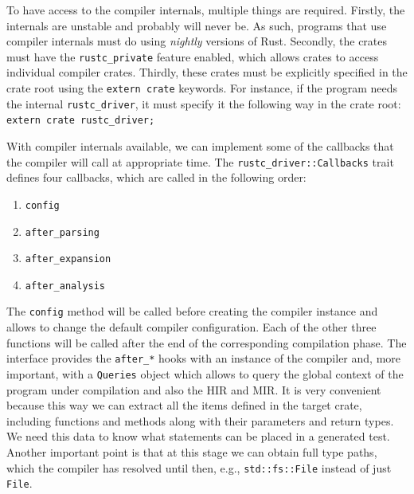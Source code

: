 \documentclass{article}
\begin{document}
To have access to the compiler internals, multiple things are required. Firstly, the internals are unstable and probably will never be. As such, programs that use compiler internals must do using \textit{nightly} versions of Rust. Secondly, the crates must have the \lstinline{rustc_private} feature enabled, which allows crates to access individual compiler crates. Thirdly, these crates must be explicitly specified in the crate root using the \lstinline{extern crate} keywords. For instance, if the program needs the internal \lstinline{rustc_driver}, it must specify it the following way in the crate root: \lstinline{extern crate rustc_driver;}

With compiler internals available, we can implement some of the callbacks that the compiler will call at appropriate time. The \lstinline{rustc_driver::Callbacks} trait defines four callbacks, which are called in the following order:
\begin{enumerate}
    \item \lstinline{config}
    \item \lstinline{after_parsing}
    \item \lstinline{after_expansion}
    \item \lstinline{after_analysis}
\end{enumerate}

The \lstinline{config} method will be called before creating the compiler instance and allows to change the default compiler configuration. Each of the other three functions will be called after the end of the corresponding compilation phase. The interface provides the \lstinline{after_*} hooks with an instance of the compiler and, more important, with a \lstinline{Queries} object which allows to query the global context of the program under compilation and also the \ac{HIR} and \ac{MIR}. It is very convenient because this way we can extract all the items defined in the target crate, including functions and methods along with their parameters and return types. We need this data to know what statements can be placed in a generated test. Another important point is that at this stage we can obtain full type paths, which the compiler has resolved until then, e.g., \lstinline{std::fs::File} instead of just \lstinline{File}.
\end{document}
